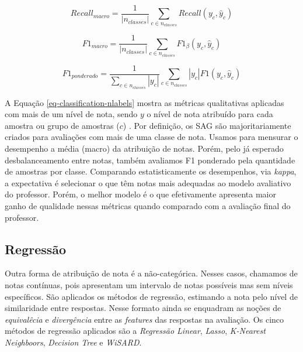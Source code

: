 \begin{equation*}
Recall_{macro} = \frac{1}{\left|n_{classes}\right|} \sum_{c \in n_{classes}} Recall(y_c, \hat{y}_c)
\end{equation*}

\begin{equation*}
F{1}_{macro} = \frac{1}{\left|n_{classes}\right|} \sum_{c \in n_{classes}} F{1}_\beta(y_c, \hat{y}_c)
\end{equation*}

\begin{equation*}
F{1}_{ponderado} = \frac{1}{\sum_{c \in n_{classes}} \left|y_c\right|} \sum_{c \in n_{classes}} \left|y_c\right| F{1}(y_c, \hat{y}_c)
\end{equation*}

A Equação \ref{eq-classification-nlabels} mostra as métricas qualitativas aplicadas com mais de um nível de nota, sendo $y$ o nível de nota atribuído para cada amostra ou grupo de amostras ($c$) \cite{manning2008}. Por definição, os SAG são majoritariamente criados para avaliações com mais de uma classe de nota. Usamos para mensurar o desempenho a média (macro) da atribuição de notas. Porém, pelo já esperado desbalanceamento entre notas, também avaliamos F1 ponderado pela quantidade de amostras por classe. Comparando estatisticamente os desempenhos, via \textit{kappa}, a expectativa é selecionar o que têm notas mais adequadas ao modelo avaliativo do professor. Porém, o melhor modelo é o que efetivamente apresenta maior ganho de qualidade nessas métricas quando comparado com a avaliação final do professor.


\subsection{Regressão}
\label{subsec-regressao}

Outra forma de atribuição de nota é a não-categórica. Nesses casos, chamamos de notas contínuas, pois apresentam um intervalo de notas possíveis mas sem níveis específicos. São aplicados os métodos de regressão, estimando a nota pelo nível de similaridade entre respostas. Nesse formato ainda se enquadram as noções de \textit{equivalêcia} e \textit{divergência} entre as \textit{features} das respostas na avaliação. Os cinco métodos de regressão aplicados são a \textit{Regressão Linear}, \textit{Lasso}, \textit{K-Nearest Neighboors}, \textit{Decision Tree} e \textit{WiSARD}.


